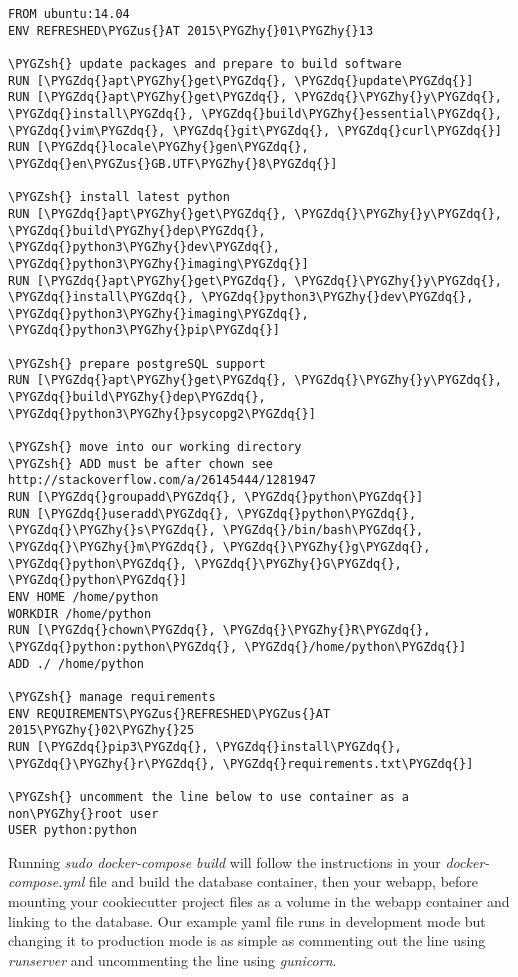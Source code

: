 \documentclass[letterpaper,10pt,english]{sphinxmanual}
\def\PYGZus{\char`\_}
\def\PYGZsh{\char`\#}
\def\PYGZhy{\char`\-}
\def\PYGZdq{\char`\"}
\begin{document}
\begin{Verbatim}[commandchars=\\\{\}]
FROM ubuntu:14.04
ENV REFRESHED\PYGZus{}AT 2015\PYGZhy{}01\PYGZhy{}13

\PYGZsh{} update packages and prepare to build software
RUN [\PYGZdq{}apt\PYGZhy{}get\PYGZdq{}, \PYGZdq{}update\PYGZdq{}]
RUN [\PYGZdq{}apt\PYGZhy{}get\PYGZdq{}, \PYGZdq{}\PYGZhy{}y\PYGZdq{}, \PYGZdq{}install\PYGZdq{}, \PYGZdq{}build\PYGZhy{}essential\PYGZdq{}, \PYGZdq{}vim\PYGZdq{}, \PYGZdq{}git\PYGZdq{}, \PYGZdq{}curl\PYGZdq{}]
RUN [\PYGZdq{}locale\PYGZhy{}gen\PYGZdq{}, \PYGZdq{}en\PYGZus{}GB.UTF\PYGZhy{}8\PYGZdq{}]

\PYGZsh{} install latest python
RUN [\PYGZdq{}apt\PYGZhy{}get\PYGZdq{}, \PYGZdq{}\PYGZhy{}y\PYGZdq{}, \PYGZdq{}build\PYGZhy{}dep\PYGZdq{}, \PYGZdq{}python3\PYGZhy{}dev\PYGZdq{}, \PYGZdq{}python3\PYGZhy{}imaging\PYGZdq{}]
RUN [\PYGZdq{}apt\PYGZhy{}get\PYGZdq{}, \PYGZdq{}\PYGZhy{}y\PYGZdq{}, \PYGZdq{}install\PYGZdq{}, \PYGZdq{}python3\PYGZhy{}dev\PYGZdq{}, \PYGZdq{}python3\PYGZhy{}imaging\PYGZdq{}, \PYGZdq{}python3\PYGZhy{}pip\PYGZdq{}]

\PYGZsh{} prepare postgreSQL support
RUN [\PYGZdq{}apt\PYGZhy{}get\PYGZdq{}, \PYGZdq{}\PYGZhy{}y\PYGZdq{}, \PYGZdq{}build\PYGZhy{}dep\PYGZdq{}, \PYGZdq{}python3\PYGZhy{}psycopg2\PYGZdq{}]

\PYGZsh{} move into our working directory
\PYGZsh{} ADD must be after chown see http://stackoverflow.com/a/26145444/1281947
RUN [\PYGZdq{}groupadd\PYGZdq{}, \PYGZdq{}python\PYGZdq{}]
RUN [\PYGZdq{}useradd\PYGZdq{}, \PYGZdq{}python\PYGZdq{}, \PYGZdq{}\PYGZhy{}s\PYGZdq{}, \PYGZdq{}/bin/bash\PYGZdq{}, \PYGZdq{}\PYGZhy{}m\PYGZdq{}, \PYGZdq{}\PYGZhy{}g\PYGZdq{}, \PYGZdq{}python\PYGZdq{}, \PYGZdq{}\PYGZhy{}G\PYGZdq{}, \PYGZdq{}python\PYGZdq{}]
ENV HOME /home/python
WORKDIR /home/python
RUN [\PYGZdq{}chown\PYGZdq{}, \PYGZdq{}\PYGZhy{}R\PYGZdq{}, \PYGZdq{}python:python\PYGZdq{}, \PYGZdq{}/home/python\PYGZdq{}]
ADD ./ /home/python

\PYGZsh{} manage requirements
ENV REQUIREMENTS\PYGZus{}REFRESHED\PYGZus{}AT 2015\PYGZhy{}02\PYGZhy{}25
RUN [\PYGZdq{}pip3\PYGZdq{}, \PYGZdq{}install\PYGZdq{}, \PYGZdq{}\PYGZhy{}r\PYGZdq{}, \PYGZdq{}requirements.txt\PYGZdq{}]

\PYGZsh{} uncomment the line below to use container as a non\PYGZhy{}root user
USER python:python
\end{Verbatim}

Running \emph{sudo docker-compose build} will follow the instructions in your \emph{docker-compose.yml} file and build the database container, then your webapp, before mounting your cookiecutter project files as a volume in the webapp container and linking to the database. Our example yaml file runs in development mode but changing it to production mode is as simple as commenting out the line using \emph{runserver} and uncommenting the line using \emph{gunicorn}.
\end{document}
